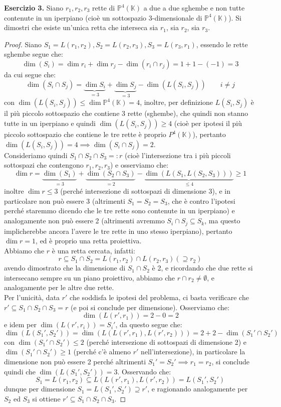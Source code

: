 \documentclass[12pt]{article}
\theoremstyle{remark}
\theoremstyle{definition}
\newenvironment{solution}{\renewcommand{\proofname}{Soluzione}\begin{proof}}{\end{proof}}
\newcommand{\PP}{\mathbb{P}}
\newcommand{\KK}{\mathbb{K}}
\begin{document}
\noindent \textbf{Esercizio 3.} Siano $r_1,r_2,r_3$ rette di $\PP^4(\KK)$ a due a due sghembe e non tutte contenute in un iperpiano (cioè un sottospazio $3$-dimensionale di $\PP^4(\KK)$). Si dimostri che esiste un'unica retta 
che interseca sia $r_1$, sia $r_2$, sia $r_3$.

\begin{solution}
  Siano $S_1 = L(r_1,r_2), S_2 = L(r_2,r_3), S_3 = L(r_3,r_1)$, essendo le rette sghembe segue che:
  \[ \dim(S_i) = \dim r_i + \dim r_j - \dim (r_i \cap r_j) = 1 + 1 - (-1) = 3
    \]
  da cui segue che:
  \[ \dim(S_i \cap S_j) = \underbrace{\dim S_i}_{= 3} + \underbrace{\dim S_j}_{= 3} - \dim(L(S_i,S_j)) \qquad i \ne j
    \]
  con $\dim(L(S_i,S_j)) \leq \dim \PP^4(\KK) = 4$, inoltre, per definizione $L(S_i,S_j)$ è il più piccolo sottospazio che contiene 3 rette (sghembe), che quindi non stanno tutte in un iperpiano e quindi $\dim(L(S_i,S_j)) \geq 4$ (cioè per ipotesi il più piccolo sottospazio che contiene le tre rette è proprio $P^4(\KK)$), pertanto $\dim(L(S_i,S_j)) = 4 \implies \dim(S_i \cap S_j) = 2$.\\
  Consideriamo quindi $S_1 \cap S_2 \cap S_3 =: r$ (cioè l'intersezione tra i più piccoli sottospazi che contengono $r_1,r_2,r_3$) e osserviamo che:
  \[ \dim r = \underbrace{\dim(S_1)}_{= 3} + \underbrace{\dim(S_2 \cap S_3)}_{= 2} - \underbrace{\dim(L(S_1,L(S_2,S_3)))}_{\leq 4} \geq 1
    \] 
  inoltre $\dim r \leq 3$ (perché intersezione di sottospazi di dimensione 3), e in particolare non può essere 3 (altrimenti $S_1 = S_2 = S_3$, che è contro l'ipotesi perché staremmo dicendo che le tre rette sono contenute in un iperpiano) e analogamente non può essere 2 (altrimenti avremmo $S_i \cap S_j \subseteq S_k$, ma questo implicherebbe ancora l'avere le tre rette in uno stesso iperpiano), pertanto $\dim r = 1$, ed è proprio una retta proiettiva.\\
  Abbiamo che $r$ è una retta cercata, infatti:
  \[ r \subseteq S_1 \cap S_2 = L(r_1,r_2) \cap L(r_2,r_3) (\supseteq r_2)
    \]
  avendo dimostrato che la dimensione di $S_1 \cap S_2$ è 2, e ricordando che due rette si intersecano sempre su un piano proiettivo, abbiamo che $r \cap r_2 \ne \emptyset$, e analogamente per le altre due rette.\\
  Per l'unicità, data $r'$ che soddisfa le ipotesi del problema, ci basta verificare che $r' \subseteq S_1 \cap S_2 \cap S_3 = r$ (e poi si conclude per dimensione). Osserviamo che:
  \[ \dim(L(r',r_1)) = 2 - 0 = 2
    \]
  e idem per $\dim(L(r',r_i)) = S_i'$, da questo segue che:
  \[ \dim(L(S_1',S_2')) = \dim(L(L(r',r_1),L(r',r_2))) = 2 + 2 - \dim(S_1' \cap S_2')
    \]
  con $\dim(S_1' \cap S_2') \leq 2$ (perché intersezione di sottospazi di dimensione 2) e $\dim(S_1' \cap S_2') \geq 1$ (perché c'è almeno $r'$ nell'intersezione), in particolare la dimensione non può essere 2 perché altrimenti $S_1'=S_2' \implies r_1 = r_2$, si conclude quindi che $\dim(L(S_1',S_2')) = 3$. Osservando che:
  \[ S_1 = L(r_1,r_2)\subseteq L(L(r',r_1),L(r',r_2)) = L(S_1',S_2')
    \]
  dunque per dimensione $S_1 = L(S_1',S_2') \supseteq r'$, e ragionando analogamente per $S_2$ ed $S_3$ si ottiene $r' \subseteq S_1 \cap S_2 \cap S_3$.
\end{solution}
\end{document}
